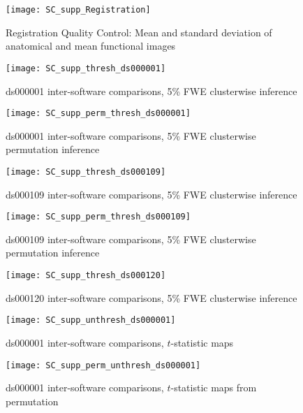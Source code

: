 \begin{figure}[htbp]
\centering
	\texttt{[image: SC\_supp\_Registration]}	
\caption{Registration Quality Control: Mean and standard deviation of anatomical and mean functional images}
\label{fig:SC_supp_Registration}
\end{figure}

\begin{figure}[htbp]
\centering
	\texttt{[image: SC\_supp\_thresh\_ds000001]}	
\caption{ds000001 inter-software comparisons, 5\% FWE clusterwise inference}
\label{fig:SC_supp_thresh_ds000001}
\end{figure}

\begin{figure}[htbp]
\centering
	\texttt{[image: SC\_supp\_perm\_thresh\_ds000001]}	
\caption{ds000001 inter-software comparisons, 5\% FWE clusterwise permutation inference}
\label{fig:SC_supp_perm_thresh_ds000001}
\end{figure}

\begin{figure}[htbp]
\centering
	\texttt{[image: SC\_supp\_thresh\_ds000109]}	
\caption{ds000109 inter-software comparisons, 5\% FWE clusterwise inference}
\label{fig:SC_supp_thresh_ds000109}
\end{figure}

\begin{figure}[htbp]
\centering
	\texttt{[image: SC\_supp\_perm\_thresh\_ds000109]}	
\caption{ds000109 inter-software comparisons, 5\% FWE clusterwise permutation inference}
\label{fig:SC_supp_perm_thresh_ds000109}
\end{figure}

\begin{figure}[htbp]
\centering
	\texttt{[image: SC\_supp\_thresh\_ds000120]}	
\caption{ds000120 inter-software comparisons, 5\% FWE clusterwise inference}
\label{fig:SC_supp_thresh_ds000120}
\end{figure}

\begin{figure}[htbp]
\centering
	\texttt{[image: SC\_supp\_unthresh\_ds000001]}	
\caption{ds000001 inter-software comparisons, $t$-statistic maps}
\label{fig:SC_supp_unthresh_ds000001}
\end{figure}

\begin{figure}[htbp]
\centering
	\texttt{[image: SC\_supp\_perm\_unthresh\_ds000001]}	
\caption{ds000001 inter-software comparisons, $t$-statistic maps from permutation}
\label{fig:SC_supp_perm_unthresh_ds000001}
\end{figure}

